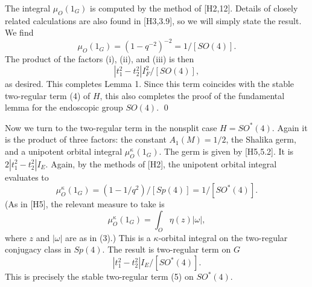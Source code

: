 \documentclass{amsart}
\begin{document}
The integral $\mu_O(1_G)$ is computed by the method of [H2,12].
Details of closely related calculations are also found in [H3,3.9], so
we will simply state the result.  We find
$$\mu_O(1_G) = (1-q^{-2})^{-2} = 1/[SO(4)].$$
The product of the factors (i), (ii), and (iii)
is then
$$|t_1^2 -t_2^2| I_F^2/[SO(4)],$$
as desired.  This completes Lemma 1.
Since this term coincides with the stable two-regular term (4)
of $H$, this also completes the proof of the fundamental
lemma for the endoscopic group $SO(4)$. \qed

Now we turn to the two-regular term 
in the nonsplit case $H = SO^*(4)$. Again it is the
product of three factors: the constant
$A_1(M) = 1/2$, the Shalika germ, and a unipotent
orbital integral $\mu^\kappa_O(1_G)$.
The germ is given by [H5,5.2]. It is
$2 |t_1^2 -t_2^2| I_E$.
Again, by the methods of [H2],
the unipotent orbital integral evaluates to
$$\mu_O^\kappa (1_G) = (1-1/q^2)/[Sp(4)] = 1/[SO^*(4)].$$
(As in [H5], the relevant measure to take is
$$\mu_O^\kappa (1_G) = \int_O \eta (z) |\omega|,$$
where $z$ and $|\omega|$ are as in (3).)
This  is a $\kappa$-orbital
integral on the two-regular conjugacy class in $Sp(4)$. 
The result is two-regular term on $G$
$$|t_1^2 - t_2^2| I_E/[SO^*(4)].$$
This is precisely the stable two-regular
term (5) on $SO^*(4)$.
\end{document}
